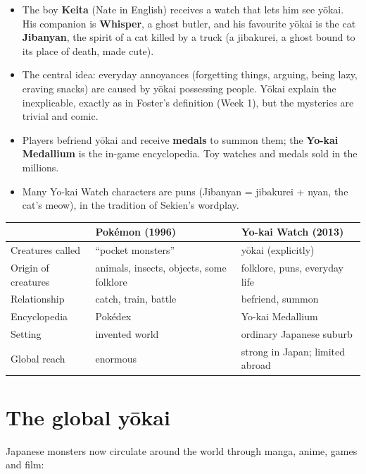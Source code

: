 \begin{itemize}
  \item The boy \textbf{Keita} (Nate in English) receives a watch that lets him see yōkai.
        His companion is \textbf{Whisper}, a ghost butler, and his favourite yōkai is the
        cat \textbf{Jibanyan}, the spirit of a cat killed by a truck (a jibakurei, a ghost
        bound to its place of death, made cute).
  \item The central idea: everyday annoyances (forgetting things, arguing, being lazy,
        craving snacks) are caused by yōkai possessing people. Yōkai explain the
        inexplicable, exactly as in Foster's definition (Week 1), but the mysteries are
        trivial and comic.
  \item Players befriend yōkai and receive \textbf{medals} to summon them; the
        \textbf{Yo-kai Medallium} is the in-game encyclopedia. Toy watches and medals sold
        in the millions.
  \item Many Yo-kai Watch characters are puns (Jibanyan = jibakurei + nyan, the cat's
        meow), in the tradition of Sekien's wordplay.
\end{itemize}

\begin{center}
\begin{tabular}{p{3.2cm}p{4.8cm}p{4.8cm}}
\toprule
 & Pokémon (1996) & Yo-kai Watch (2013) \\
\midrule
Creatures called & ``pocket monsters'' & yōkai (explicitly) \\
Origin of creatures & animals, insects, objects, some folklore & folklore, puns, everyday life \\
Relationship & catch, train, battle & befriend, summon \\
Encyclopedia & Pokédex & Yo-kai Medallium \\
Setting & invented world & ordinary Japanese suburb \\
Global reach & enormous & strong in Japan; limited abroad \\
\bottomrule
\end{tabular}
\end{center}

\section{The global yōkai}

Japanese monsters now circulate around the world through manga, anime, games and film:

